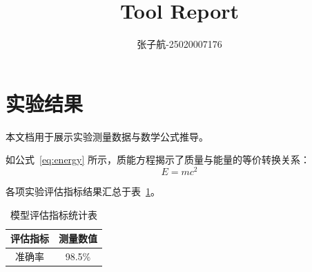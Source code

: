 \documentclass{article}
\title{Tool Report}
\author{张子航-25020007176}
\begin{document}
\maketitle

\section{实验结果}
本文档用于展示实验测量数据与数学公式推导。

如公式~\eqref{eq:energy} 所示，质能方程揭示了质量与能量的等价转换关系：
\begin{equation}\label{eq:energy}
E = mc^2
\end{equation}

各项实验评估指标结果汇总于表~\ref{tab:results}。

\begin{table}[htbp]
\centering
\begin{tabular}{|c|c|}
\hline
评估指标 & 测量数值 \\
\hline
准确率 & 98.5\% \\
\hline
\end{tabular}
\caption{模型评估指标统计表}
\label{tab:results}
\end{table}
\end{document}
